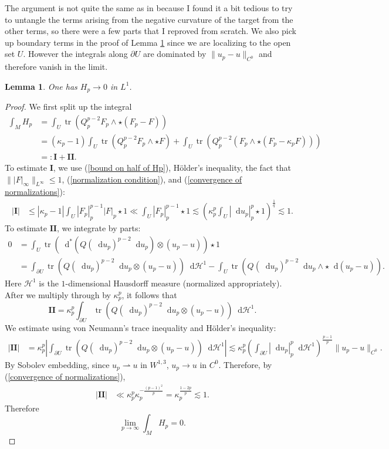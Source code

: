 \documentclass[reqno,11pt]{amsart}
\newcommand*\dif{\mathop{}\!\mathrm{d}}
\DeclareMathOperator{\tr}{tr}
\newtheorem{lemma}[theorem]{Lemma}
\newcommand{\weakto}{\rightharpoonup}
\theoremstyle{definition}
\numberwithin{equation}{section}
\begin{document}
The argument is not quite the same as in \cite[\S7]{daskalopoulos2022analytic} because I found it a bit tedious to try to untangle the terms arising from the negative curvature of the target from the other terms, so there were a few parts that I reproved from scratch.
We also pick up boundary terms in the proof of Lemma \ref{decay of tau} since we are localizing to the open set $U$.
However the integrals along $\partial U$ are dominated by $\|u_p - u\|_{C^0}$ and therefore vanish in the limit.

\begin{lemma}\label{decay of tau}
One has $H_p \to 0$ in $L^1$.
\end{lemma}
\begin{proof}
We first split up the integral
\begin{align*}
\int_M H_p
&= \int_U \tr(Q_p^{p - 2} F_p \wedge \star(F_p - F)) \\
&= (\kappa_p - 1) \int_U \tr(Q_p^{p - 2} F_p \wedge \star F) + \int_U \tr(Q_p^{p - 2} (F_p \wedge \star (F_p - \kappa_p F))) \\
&=: \mathbf I + \mathbf{II}.
\end{align*}
To estimate $\mathbf I$, we use (\ref{bound on half of Hp}), H\"older's inequality, the fact that $\||F|_\infty\|_{L^\infty} \leq 1$, (\ref{normalization condition}), and (\ref{convergence of normalizations}):
\begin{align*}
|\mathbf I| &\leq |\kappa_p - 1| \int_U |F_p|_p^{p - 1} |F|_p \star 1 \ll \int_U |F_p|_p^{p - 1} \star 1 \lesssim \left(\kappa_p^p \int_U |\dif u_p|_p^p \star 1\right)^{\frac{1}{q}} \lesssim 1.
\end{align*}
To estimate $\mathbf{II}$, we integrate by parts:
\begin{align*}
0 &= \int_U \tr(\dif^*(Q(\dif u_p)^{p - 2} \dif u_p) \otimes (u_p - u)) \star 1 \\
&= \int_{\partial U} \tr(Q(\dif u_p)^{p - 2} \dif u_p \otimes (u_p - u)) \dif \mathcal H^1 - \int_U \tr(Q(\dif u_p)^{p - 2} \dif u_p \wedge \star \dif (u_p - u)).
\end{align*}
Here $\mathcal H^1$ is the $1$-dimensional Hausdorff measure (normalized appropriately).
After we multiply through by $\kappa_p^p$, it follows that 
$$\mathbf{II} = \kappa_p^p \int_{\partial U} \tr(Q(\dif u_p)^{p - 2} \dif u_p \otimes (u_p - u)) \dif \mathcal H^1.$$
We estimate using von Neumann's trace inequality and H\"older's inequality:
\begin{align*}
|\mathbf{II}| &= \kappa_p^p \left|\int_{\partial U} \tr(Q(\dif u_p)^{p - 2} \dif u_p \otimes (u_p - u)) \dif \mathcal H^1\right|
\lesssim \kappa_p^p \left(\int_{\partial U} |\dif u_p|_p^p \dif \mathcal H^1\right)^{\frac{p - 1}{p}} \|u_p - u\|_{C^0} .
\end{align*}
By Sobolev embedding, since $u_p \weakto u$ in $W^{1, 3}$, $u_p \to u$ in $C^0$.
Therefore, by (\ref{convergence of normalizations}),
\begin{align*}
|\mathbf{II}| &\ll \kappa_p^p \kappa_p^{-\frac{(p - 1)^2}{p}} = \kappa_p^{\frac{1 - 2p}{p}} \lesssim 1. 
\end{align*}
Therefore
$$\lim_{p \to \infty} \int_M H_p = 0.$$


\end{proof}
\end{document}
